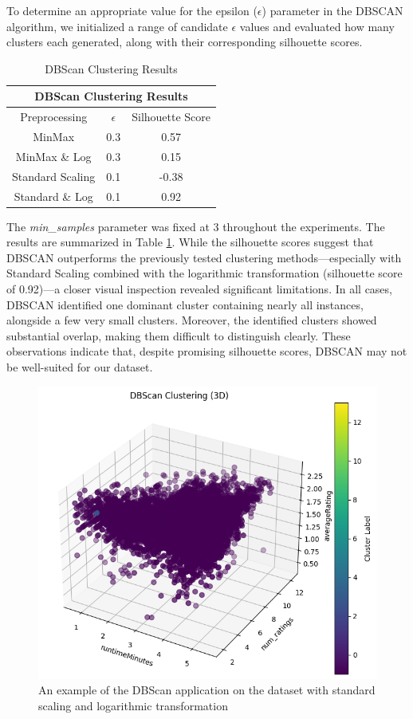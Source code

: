 \documentclass[10pt]{article}
\begin{document}
To determine an appropriate value for the epsilon ($\epsilon$) parameter in the DBSCAN algorithm, we initialized a range of candidate $\epsilon$ values and evaluated how many clusters each generated, along with their corresponding silhouette scores.
\begin{table}[ht!]
    \centering
    \begin{tabular}{|c|c|c|}
    \hline
    \multicolumn{3}{|c|}{DBScan Clustering Results} \\
    \hline
     Preprocessing & $\epsilon$ & Silhouette Score \\
    \hline
    MinMax & 0.3 & 0.57 \\
    MinMax \& Log & 0.3 & 0.15 \\
    Standard Scaling & 0.1 & -0.38 \\
    Standard \& Log & 0.1 & 0.92 \\
    \hline
    \end{tabular}
    \caption{DBScan Clustering Results}
    \label{table:DB}
\end{table}
The \textit{min\_samples} parameter was fixed at 3 throughout the experiments. The results are summarized in Table  \ref{table:DB}.
While the silhouette scores suggest that DBSCAN outperforms the previously tested clustering methods—especially with Standard Scaling combined with the logarithmic transformation (silhouette score of 0.92)—a closer visual inspection revealed significant limitations. In all cases, DBSCAN identified one dominant cluster containing nearly all instances, alongside a few very small clusters. Moreover, the identified clusters showed substantial overlap, making them difficult to distinguish clearly. These observations indicate that, despite promising silhouette scores, DBSCAN may not be well-suited for our dataset.
\begin{figure}[ht!]
    \centering
    \includegraphics[width=0.4\linewidth]{3d_Dbscan.png}
    \caption{An example of the DBScan application on the dataset with standard scaling and logarithmic transformation}
    \label{fig:3d_Dbscan}
\end{figure}
\end{document}
